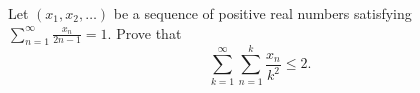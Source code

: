 \documentclass{article}
\begin{document}
\setlength{\parindent}{0pt}
Let $(x_1,x_2,\ldots)$ be a sequence of positive real numbers satisfying ${\displaystyle \sum_{n=1}^{\infty}\frac{x_n}{2n-1}=1}$. Prove that$$\displaystyle \sum_{k=1}^{\infty} \sum_{n=1}^{k}\frac{x_n}{k^2} \le2.$$
\end{document}

